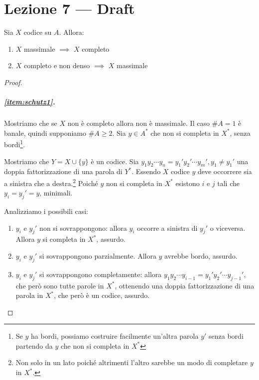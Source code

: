 \chapter{Lezione 7 --- Draft}


\begin{theorem}[Schützenberger]
  Sia \(X\) codice su \(A\). Allora:
  \begin{enumerate}
    \item \(X\) massimale \(\implies\) \(X\) completo\label{item:schutz1}
    \item \(X\) completo e non denso \(\implies\) \(X\) massimale\label{item:schutz2}
  \end{enumerate}
\end{theorem}
\begin{proof}
  \paragraph{\ref{item:schutz1}.}
  Mostriamo che se \(X\) non è completo allora non è massimale.
  Il caso \(\# A = 1\) è banale, quindi supponiamo \(\# A \geq 2\).
  Sia \(y \in A^{*} \) che non si completa in \(X^{*}\), senza bordi\footnote{Se \(y\) ha bordi, possiamo costruire facilmente un'altra parola \(y'\) senza bordi partendo da \(y\) che non si completa in \(X^{*}\)}.


  Mostriamo che \(Y = X \cup \{y\}\) è un codice.
  Sia \(y_1 y_2 \cdots y_n = y_1' y_2' \cdots y_m', y_1\neq y_1'\) una doppia fattorizzazione di una parola di \(Y^*\).
  Essendo \(X\) codice \(y\) deve occorrere sia a sinistra che a destra.\footnote{Non solo in un lato poiché altrimenti l'altro sarebbe un modo di completare \(y\) in \(X^*\).}
  Poiché \(y\) non si completa in \(X^*\) esistono \(i\) e \(j\) tali che \(y_i = y_j' = y\), minimali.


  Analizziamo i possibili casi:
  \begin{enumerate}
    \item \(y_i\) e \(y_j'\) non si sovrappongono: allora \(y_i\) occorre a sinistra di \(y_j'\) o viceversa. Allora \(y\) si completa in \(X^*\), assurdo.
    \item \(y_i\) e \(y_j'\) si sovrappongono parzialmente.
      Allora \(y\) avrebbe bordo, assurdo.
      \item \(y_i\) e \( y_j'\) si sovrappongono completamente: allora \(y_1y_2 \cdots y_{i-1} = y_1'y_2' \cdots y_{j-1}'\), che però sono tutte parole in \(X^*\), ottenendo una doppia fattorizzazione di una parola in \(X^*\), che però è un codice, assurdo. 
  \end{enumerate}
\end{proof}

